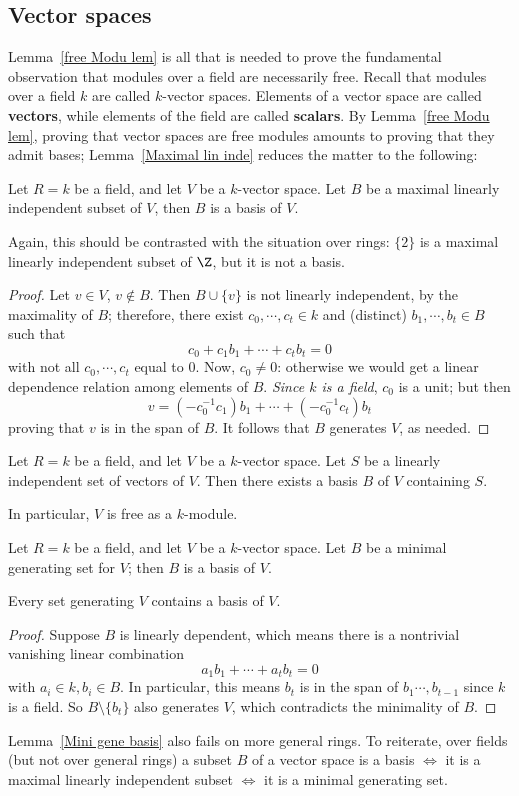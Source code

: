 \subsection{Vector spaces}
Lemma~\ref{free Modu lem} is all that is needed to prove the fundamental observation that modules over a field are necessarily free. Recall that modules over a field $k$ are called $k$-vector spaces. Elements of a vector space are called \textbf{vectors}, while elements of the field are called \textbf{scalars}.
By Lemma~\ref{free Modu lem}, proving that vector spaces are free modules amounts to proving
that they admit bases; Lemma~\ref{Maximal lin inde} reduces the matter to the following:
\begin{lemma}\label{Maxi lininde basis}
Let $R=k$ be a field, and let $V$ be a $k$-vector space. Let $B$ be a maximal linearly independent subset of $V$, then $B$ is a basis of $V$.
\end{lemma}
Again, this should be contrasted with the situation over rings: $\{2\}$ is a maximal linearly independent subset of $\Z$, but it is not a basis.
\begin{proof}
Let $v\in V$, $v\notin B$. Then $B\cup\{v\}$ is not linearly independent, by the maximality of $B$; therefore, there exist $c_0,\cdots,c_t\in k$ and (distinct) $b_1,\cdots,b_t\in B$ such that
\[c_0+c_1b_1+\cdots+c_tb_t=0\]
with not all $c_0,\cdots,c_t$ equal to $0$. Now, $c_0\neq0$: otherwise we would get a linear
dependence relation among elements of $B$. \textit{Since $k$ is a field}, $c_0$ is a unit; but then
\[v=(-c_0^{-1}c_1)b_1+\cdots+(-c_0^{-1}c_t)b_t\]
proving that $v$ is in the span of $B$. It follows that $B$ generates $V$, as needed.
\end{proof}
\vspace{5mm}
\begin{proposition}\label{Vec basis}
Let $R=k$ be a field, and let $V$ be a $k$-vector space. Let $S$ be a linearly independent set of vectors of $V$. Then there exists a basis $B$ of $V$ containing $S$.\par
In particular, $V$ is free as a $k$-module.
\end{proposition}
\begin{lemma}\label{Mini gene basis}
Let $R=k$ be a field, and let $V$ be a $k$-vector space. Let $B$ be a minimal generating set for $V$; then $B$ is a basis of $V$.\par
Every set generating $V$ contains a basis of $V$.
\end{lemma}
\begin{proof}
Suppose $B$ is linearly dependent, which means there is a nontrivial vanishing linear combination
\[a_1b_1+\cdots+a_tb_t=0\]
with $a_i\in k, b_i\in B$. In particular, this means $b_t$ is in the span of $b_1\cdots,b_{t-1}$ since $k$ is a field. So $B\setminus\{b_t\}$ also generates $V$, which contradicts the minimality of $B$.
\end{proof}
Lemma~\ref{Mini gene basis} also fails on more general rings. To reiterate, over fields (but not over general rings) a subset $B$ of a vector space is a basis $\iff$ it is a maximal linearly independent subset $\iff$ it is a minimal generating set.
\vspace{5mm}
